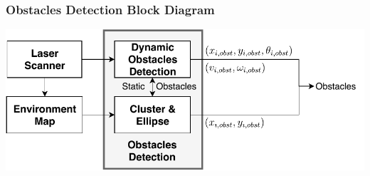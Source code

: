 	\begin{frame}
		\frametitle{Obstacles Detection Block Diagram}
		\centering
		\includegraphics[scale=0.9]{pictures/block_diagram_obst_1.pdf}
	\end{frame}
